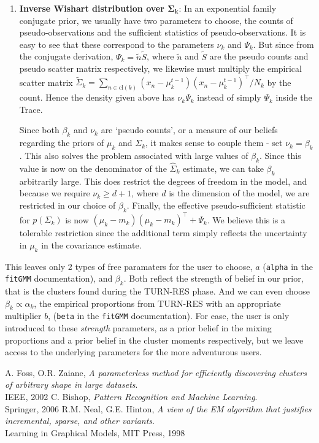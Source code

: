 \documentclass[11pt]{article}
\def\bs{\boldsymbol}
\def\Tr{^\top}
\begin{document}
\begin{enumerate}
\item \textbf{Inverse Wishart distribution over $\bs{\Sigma_k}$}: In an exponential family conjugate prior, we usually have two parameters to choose, the counts of pseudo-observations and the sufficient statistics of pseudo-observations. It is easy to see that these correspond to the parameters $\nu_k$ and $\Psi_k$. But since from the conjugate derivation, $\Psi_k = \tilde{n}\tilde{S}$, where $\tilde{n}$ and $\tilde{S}$ are the pseudo counts and pseudo scatter matrix respectively, we likewise must multiply the empirical scatter matrix $\tilde{\Sigma}_k = \sum_{n \in \text{cl}(k)} (x_n - \mu_k^{t-1})(x_n - \mu_k^{t-1})\Tr /N_k$ by the count. Hence the density given above has $\nu_k\Psi_k$ instead of simply $\Psi_k$ inside the Trace.\par
Since both $\beta_k$ and $\nu_k$ are `pseudo counts', or a measure of our beliefs regarding the priors of $\mu_k$ and $\Sigma_k$, it makes sense to couple them - set $\nu_k = \beta_k$. This also solves the problem associated with large values of $\beta_k$. Since this value is now on the denominator of the $\hat\Sigma_k$ estimate, we can take $\beta_k$ arbitrarily large. This does restrict the degrees of freedom in the model, and because we require $\nu_k \ge d+1$, where $d$ is the dimension of the model, we are restricted in our choice of $\beta_k$. Finally, the effective pseudo-sufficient statistic for $p(\Sigma_k)$ is now $(\mu_k - m_k)(\mu_k - m_k)\Tr + \Psi_k$. We believe this is a tolerable restriction since the additional term simply reflects the uncertainty in $\mu_k$ in the covariance estimate.
\end{enumerate}
This leaves only 2 types of free paramaters for the user to choose, $a$ (\texttt{alpha} in the \texttt{fitGMM} documentation), and $\beta_k$. Both reflect the strength of belief in our prior, that is the clusters found during the TURN-RES phase. And we can even choose $\beta_k \propto \alpha_k$, the empirical proportions from TURN-RES with an appropriate multiplier $b$, (\texttt{beta} in the \texttt{fitGMM} documentation). For ease, the user is only introduced to these \emph{strength} parameters, as a prior belief in the mixing proportions and a prior belief in the cluster moments respectively, but we leave access to the underlying parameters for the more adventurous users.
\vspace{20pt}

\begin{thebibliography}{1}
{A. Foss, O.R. Zaiane,
\emph{A parameterless method for efficiently discovering clusters of arbitrary shape in large datasets}.\\
IEEE, 2002}
 {C. Bishop,
  \emph{Pattern Recognition and Machine Learning}.\\
  Springer, 2006}
 {R.M. Neal, G.E. Hinton,
  \emph{A view of the EM algorithm that justifies incremental, sparse, and other variants}.\\
  Learning in Graphical Models, MIT Press, 1998}
\end{thebibliography}
\end{document}
